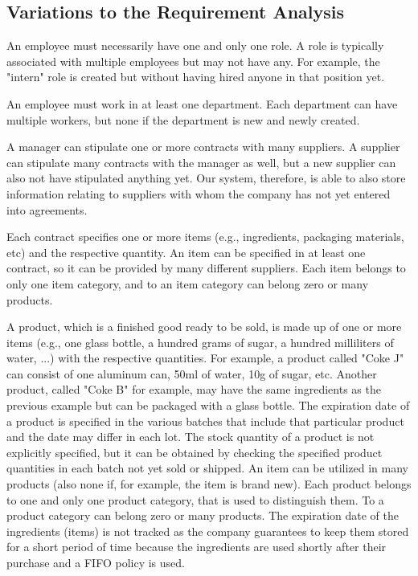 \subsection{Variations to the Requirement Analysis}


An employee must necessarily have one and only one role. A role is typically associated with multiple employees but may not have any. For example, the "intern" role is created but without having hired anyone in that position yet.

An employee must work in at least one department. Each department can have multiple workers, but none if the department is new and newly created.

A manager can stipulate one or more contracts with many suppliers. A supplier can stipulate many contracts with the manager as well, but a new supplier can also not have stipulated anything yet. Our system, therefore, is able to also store information relating to suppliers with whom the company has not yet entered into agreements.

Each contract specifies one or more items (e.g., ingredients, packaging materials, etc) and the respective quantity. An item can be specified in at least one contract, so it can be provided by many different suppliers. Each item belongs to only one item category, and to an item category can belong zero or many products.

A product, which is a finished good ready to be sold, is made up of one or more items (e.g., one glass bottle, a hundred grams of sugar, a hundred milliliters of water, ...) with the respective quantities. For example, a product called "Coke J" can consist of one aluminum can, 50ml of water, 10g of sugar, etc. Another product, called "Coke B" for example, may have the same ingredients as the previous example but can be packaged with a glass bottle. The expiration date of a product is specified in the various batches that include that particular product and the date may differ in each lot. The stock quantity of a product is not explicitly specified, but it can be obtained by checking the specified product quantities in each batch not yet sold or shipped. An item can be utilized in many products (also none if, for example, the item is brand new). Each product belongs to one and only one product category, that is used to distinguish them. To a product category can belong zero or many products. The expiration date of the ingredients (items) is not tracked as the company guarantees to keep them stored for a short period of time because the ingredients are used shortly after their purchase and a FIFO policy is used.

